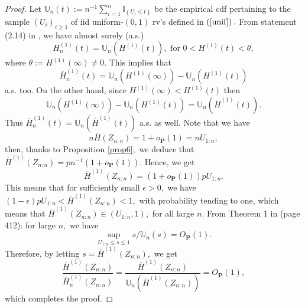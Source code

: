 \documentclass[reqno,openbib,runningheads,a4paper,12pt]{amsart}%
\begin{document}
\begin{proof}
Let $\mathbb{U}_{n}\left(  t\right)  :=n^{-1}\sum_{i=1}^{n}\mathbb{I}%
_{\left\{  U_{i}\leq t\right\}  }$ be the empirical cdf pertaining to the
sample $\left(  U_{i}\right)  _{i\geq1}$ of iid uniform-$\left(  0,1\right)  $
rv's defined in $\left(  \ref{unif}\right)  .$ From statement (2.14) in
\cite{Deheuvels1996}, we have almost surely (a.s.)%
\[
H_{n}^{\left(  1\right)  }\left(  t\right)  =\mathbb{U}_{n}\left(  H^{\left(
1\right)  }\left(  t\right)  \right)  ,\text{ for }0<H^{\left(  1\right)
}\left(  t\right)  <\theta,
\]
where $\theta:=H^{\left(  1\right)  }\left(  \infty\right)  \neq0.$ This
implies that
\[
\overline{H}_{n}^{\left(  1\right)  }\left(  t\right)  =\mathbb{U}_{n}\left(
H^{\left(  1\right)  }\left(  \infty\right)  \right)  -\mathbb{U}_{n}\left(
H^{\left(  1\right)  }\left(  t\right)  \right)
\]
a.s. too. On the other hand, since $H^{\left(  1\right)  }\left(
\infty\right)  <H^{\left(  1\right)  }\left(  t\right)  $ then
\[
\mathbb{U}_{n}\left(  H^{\left(  1\right)  }\left(  \infty\right)  \right)
-\mathbb{U}_{n}\left(  H^{\left(  1\right)  }\left(  t\right)  \right)
=\mathbb{U}_{n}\left(  \overline{H}^{\left(  1\right)  }\left(  t\right)
\right)  .
\]
Thus $\overline{H}_{n}^{\left(  1\right)  }\left(  t\right)  =\mathbb{U}%
_{n}\left(  \overline{H}^{\left(  1\right)  }\left(  t\right)  \right)  $ a.s.
as well. Note that we have%
\[
n\overline{H}\left(  Z_{n:n}\right)  =1+o_{\mathbf{P}}\left(  1\right)
=nU_{1:n},
\]
then, thanks to Proposition \ref{prop6}$,$ we deduce that $\overline
{H}^{\left(  1\right)  }\left(  Z_{n:n}\right)  =pn^{-1}\left(
1+o_{\mathbf{P}}\left(  1\right)  \right)  .$ Hence, we get
\[
\overline{H}^{\left(  1\right)  }\left(  Z_{n:n}\right)  =\left(
1+o_{\mathbf{P}}\left(  1\right)  \right)  pU_{1:n}.
\]
This means that for sufficiently small $\epsilon>0,$ we have $\left(
1-\epsilon\right)  pU_{1:n}<\overline{H}^{\left(  1\right)  }\left(
Z_{n:n}\right)  <1,$ with probability tending to one, which means that
$\overline{H}^{\left(  1\right)  }\left(  Z_{n:n}\right)  \in\left(
U_{1:n},1\right)  ,$ for all large $n.$ From Theorem 1 in \cite{SW86} (page
412): for large $n,$ we have%
\[
\sup_{U_{1:n}\leq s\leq1}s/\mathbb{U}_{n}\left(  s\right)  =O_{\mathbf{P}%
}\left(  1\right)  .
\]
Therefore, by letting $s=\overline{H}^{\left(  1\right)  }\left(
Z_{n:n}\right)  ,$ we get%
\[
\frac{\overline{H}^{\left(  1\right)  }\left(  Z_{n:n}\right)  }{\overline
{H}_{n}^{\left(  1\right)  }\left(  Z_{n:n}\right)  }=\frac{\overline
{H}^{\left(  1\right)  }\left(  Z_{n:n}\right)  }{\mathbb{U}_{n}\left(
\overline{H}^{\left(  1\right)  }\left(  Z_{n:n}\right)  \right)
}=O_{\mathbf{P}}\left(  1\right)  ,
\]
which completes the proof.
\end{proof}
\end{document}

